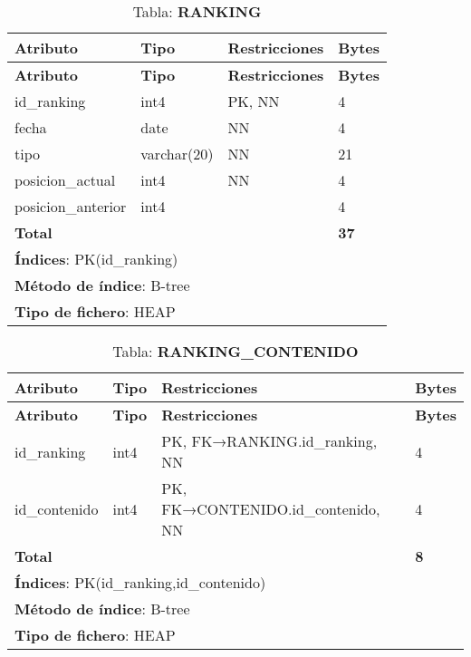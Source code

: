 \begin{longtable}{|l|l|p{5cm}|p{5cm}|}
\caption{Tabla: \textbf{RANKING}}\label{pf_ranking}\\ \hline
\textbf{Atributo} & \textbf{Tipo} & \textbf{Restricciones} & \textbf{Bytes}\\ \hline
\endfirsthead
\hline \textbf{Atributo} & \textbf{Tipo} & \textbf{Restricciones} & \textbf{Bytes}\\ \hline
\endhead
id\_ranking        & int4        & PK, NN & 4  \\ \hline
fecha              & date        & NN     & 4  \\ \hline
tipo               & varchar(20) & NN     & 21 \\ \hline
posicion\_actual   & int4        & NN     & 4  \\ \hline
posicion\_anterior & int4        &        & 4  \\ \hline
\textbf{Total} &                 &        & \textbf{37}\\ \hline
\multicolumn{4}{|l|}{\textbf{Índices}: PK(id\_ranking)} \\ \hline
\multicolumn{4}{|l|}{\textbf{Método de índice}: B-tree}\\ \hline
\multicolumn{4}{|l|}{\textbf{Tipo de fichero}: HEAP}\\ \hline
\end{longtable}

\newpage
\begin{longtable}{|l|l|p{5cm}|p{5cm}|}
\caption{Tabla: \textbf{RANKING\_CONTENIDO}}\label{pf_rank_cont}\\ \hline
\textbf{Atributo} & \textbf{Tipo} & \textbf{Restricciones} & \textbf{Bytes}\\ \hline
\endfirsthead
\hline \textbf{Atributo} & \textbf{Tipo} & \textbf{Restricciones} & \textbf{Bytes}\\ \hline
\endhead
id\_ranking   & int4 & PK\*, FK→RANKING.id\_ranking,   NN & 4 \\ \hline
id\_contenido & int4 & PK\*, FK→CONTENIDO.id\_contenido, NN & 4 \\ \hline
\textbf{Total} &      &                                     & \textbf{8}\\ \hline
\multicolumn{4}{|l|}{\textbf{Índices}: PK(id\_ranking,id\_contenido)} \\ \hline
\multicolumn{4}{|l|}{\textbf{Método de índice}: B-tree}\\ \hline
\multicolumn{4}{|l|}{\textbf{Tipo de fichero}: HEAP}\\ \hline
\end{longtable}


